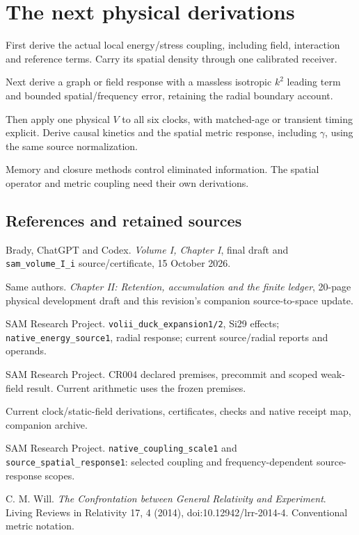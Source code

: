 \documentclass[10pt,twocolumn,letterpaper]{article}
\begin{document}
\section{The next physical derivations}
First derive the actual local energy/stress coupling, including field, interaction and reference terms. Carry its spatial density through one calibrated receiver.

Next derive a graph or field response with a massless isotropic $k^2$ leading term and bounded spatial/frequency error, retaining the radial boundary account.

Then apply one physical $V$ to all six clocks, with matched-age or transient timing explicit. Derive causal kinetics and the spatial metric response, including $\gamma$, using the same source normalization.

Memory and closure methods control eliminated information. The spatial operator and metric coupling need their own derivations.

\subsection*{References and retained sources}
{\footnotesize\raggedright
\noindent[1] Brady, ChatGPT and Codex. \emph{Volume I, Chapter I}, final draft and \nolinkurl{sam_volume_I_i} source/certificate, 15 October 2026.

\noindent[2] Same authors. \emph{Chapter II: Retention, accumulation and the finite ledger}, 20-page physical development draft and this revision's companion source-to-space update.

\noindent[3] SAM Research Project. \nolinkurl{volii_duck_expansion1/2}, Si29 effects; \nolinkurl{native_energy_source1}, radial response; current source/radial reports and operands.

\noindent[4] SAM Research Project. CR004 declared premises, precommit and scoped weak-field result. Current arithmetic uses the frozen premises.

\noindent[5] Current clock/static-field derivations, certificates, checks and native receipt map, companion archive.

\noindent[6] SAM Research Project. \nolinkurl{native_coupling_scale1} and \nolinkurl{source_spatial_response1}: selected coupling and frequency-dependent source-response scopes.

\begin{samepage}
\noindent[7] C. M. Will. \emph{The Confrontation between General Relativity and Experiment}. Living Reviews in Relativity 17, 4 (2014), doi:10.12942/lrr-2014-4. Conventional metric notation.
\par\end{samepage}

\par}
\end{document}
